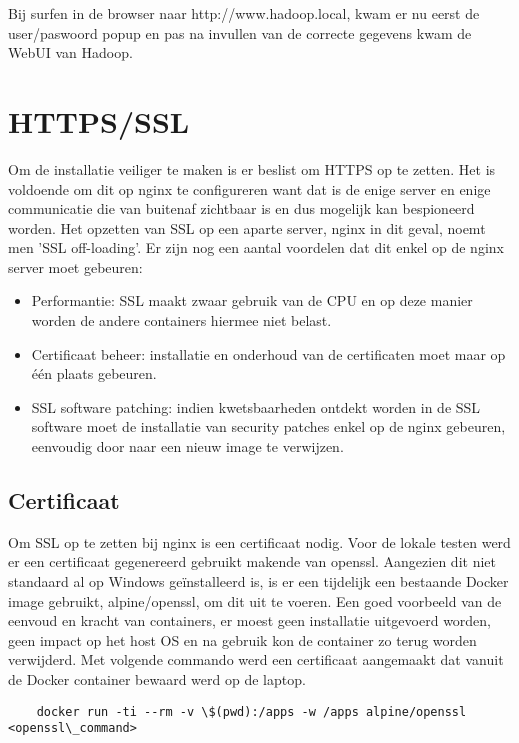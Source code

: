Bij surfen in de browser naar http://www.hadoop.local, kwam er nu eerst de user/paswoord popup en pas na invullen van de correcte gegevens kwam de WebUI van Hadoop.

\section{HTTPS/SSL}
Om de installatie veiliger te maken is er beslist om HTTPS op te zetten. Het is voldoende om dit op nginx te configureren want dat is de enige server en enige communicatie die van buitenaf zichtbaar is en dus mogelijk kan bespioneerd worden. Het opzetten van SSL op een aparte server, nginx in dit geval, noemt men 'SSL off-loading'.
\newline
Er zijn nog een aantal voordelen dat dit enkel op de nginx server moet gebeuren:

\begin{itemize}
    \item Performantie: SSL maakt zwaar gebruik van de CPU en op deze manier worden de andere containers hiermee niet belast.
    \item Certificaat beheer: installatie en onderhoud van de certificaten moet maar op \'e\'en plaats gebeuren.
    \item SSL software patching: indien kwetsbaarheden ontdekt worden in de SSL software moet de installatie van security patches enkel op de nginx gebeuren, eenvoudig door naar een nieuw image te verwijzen.
\end{itemize}



\subsection{Certificaat}
Om SSL op te zetten bij nginx is een certificaat nodig. Voor de lokale testen werd er een certificaat gegenereerd gebruikt makende van openssl. Aangezien dit niet standaard al op Windows geïnstalleerd is, is er een tijdelijk een bestaande Docker image gebruikt, alpine/openssl, om dit uit te voeren. Een goed voorbeeld van de eenvoud en kracht van containers, er moest geen installatie uitgevoerd worden, geen impact op het host OS en na gebruik kon de container zo terug worden verwijderd.
\newline
\newline
Met volgende commando werd een certificaat aangemaakt dat vanuit de Docker container bewaard werd op de laptop.

\begin{lstlisting}
    docker run -ti --rm -v \$(pwd):/apps -w /apps alpine/openssl <openssl\_command>
\end{lstlisting}

